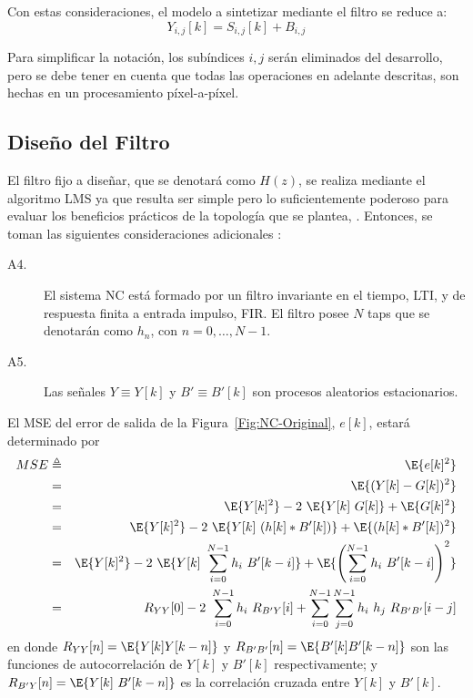 Con estas consideraciones, el modelo a sintetizar mediante el filtro se reduce a:
\begin{equation}
 Y_{i,j}[k] = S_{i,j}[k] + B_{i,j}  \label{Eq:BiasModel}
\end{equation}

Para simplificar la notación, los subíndices $i,j$ serán eliminados del desarrollo, pero se debe tener en cuenta que todas las operaciones en adelante descritas, son hechas en un procesamiento píxel-a-píxel. 


\subsection{Diseño del Filtro}
El filtro fijo a diseñar, que se denotará como $H(z)$, se realiza mediante el algoritmo LMS ya que resulta ser simple pero lo suficientemente poderoso para evaluar los beneficios prácticos de la topología que se plantea, \cite{haykin}. Entonces, se toman las siguientes consideraciones adicionales :

\begin{description}
 \item[A4.] El sistema \ac{NC} está formado por un filtro invariante en el tiempo, \ac{LTI},  y de respuesta finita a entrada impulso, \ac{FIR}. El filtro posee $N$ taps que se denotarán como $h_n$, con $n=0,\ldots,N-1$.

 \item[A5.] Las señales $Y\equiv Y[k]$ y $B'\equiv B'[k]$ son procesos aleatorios estacionarios.
\end{description}

\vspace{0.5cm}
El MSE del error de salida de la Figura~\ref{Fig:NC-Original}, $e[k]$, estará determinado por
\begin{eqnarray}\nonumber
 MSE &\triangleq& \E{e[k]^2}\\\nonumber
 &=& \E{(Y[k] - G[k])^2}\\\nonumber
 &=& \E{Y[k]^2} - 2~\E{Y[k]~G[k]} + \E{G[k]^2}\\\nonumber
 &=& \E{Y[k]^2} - 2~\E{Y[k]~(h[k]\ast B'[k])} + \E{(h[k]\ast B'[k])^2} \\\nonumber
 &=& \E{Y[k]^2} - 2~\E{Y[k]~\sum_{i=0}^{N-1}h_i~B'[k-i]} + \E{\left(\sum_{i=0}^{N-1} h_i~B'[k-i]\right)^2} \\
 &=& R_{YY}[0] - 2~\sum_{i=0}^{N-1}h_i~R_{B'Y}[i] + \sum_{i=0}^{N-1}\sum_{j=0}^{N-1}h_i~h_j~ R_{B'B'}[i-j]
\label{Eq:MSE}
\end{eqnarray}
en donde $R_{YY}[n] = \E{Y[k]Y[k-n]}$ y $R_{B'B'}[n] = \E{B'[k] B'[k-n]}$ son las funciones de autocorrelación de $Y[k]$ y $B'[k]$ respectivamente; y $R_{B'Y}[n] = \E{Y[k]~B'[k-n]}$ es la correlación cruzada entre $Y[k]$ y $B'[k]$.

